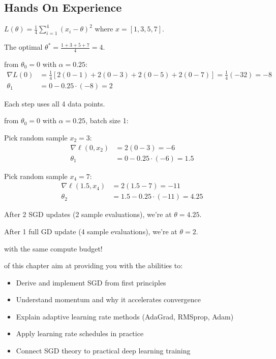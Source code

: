 \newpage
\subsection{Hands On Experience}

 $L(\theta) = \frac{1}{4}\sum_{i=1}^{4} (x_i - \theta)^2$ where $x = [1, 3, 5, 7]$.

The optimal $\theta^* = \frac{1+3+5+7}{4} = 4$.

\vspace{1em}
 from $\theta_0 = 0$ with $\alpha = 0.25$:
\begin{align*}
    \nabla L(0) &= \frac{1}{4}[2(0-1) + 2(0-3) + 2(0-5) + 2(0-7)] = \frac{1}{4}(-32) = -8 \\
    \theta_1 &= 0 - 0.25 \cdot (-8) = 2
\end{align*}

Each step uses all 4 data points.

\vspace{1em}
 from $\theta_0 = 0$ with $\alpha = 0.25$, batch size 1:


Pick random sample $x_2 = 3$:
\begin{align*}
    \nabla \ell(0, x_2) &= 2(0-3) = -6 \\
    \theta_1 &= 0 - 0.25 \cdot (-6) = 1.5
\end{align*}

Pick random sample $x_4 = 7$:
\begin{align*}
    \nabla \ell(1.5, x_4) &= 2(1.5-7) = -11 \\
    \theta_2 &= 1.5 - 0.25 \cdot (-11) = 4.25
\end{align*}

After 2 SGD updates (2 sample evaluations), we're at $\theta = 4.25$.

After 1 full GD update (4 sample evaluations), we're at $\theta = 2$.

 with the same compute budget!



\vspace{2.5em}
 of this chapter aim at providing you with the abilities to:
\begin{itemize}
    \item Derive and implement SGD from first principles
    \item Understand momentum and why it accelerates convergence
    \item Explain adaptive learning rate methods (AdaGrad, RMSprop, Adam)
    \item Apply learning rate schedules in practice
    \item Connect SGD theory to practical deep learning training
\end{itemize}




